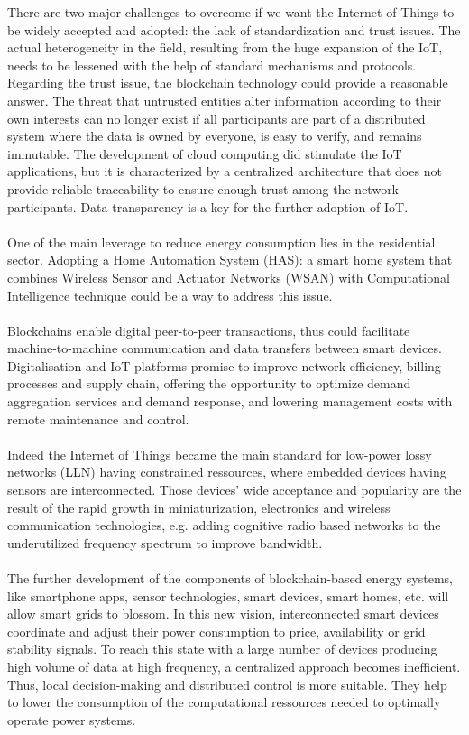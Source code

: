 \documentclass[11pt]{article}
\begin{document}
There are two major challenges to overcome if we want the Internet of Things to be widely accepted and adopted: the lack of standardization and trust issues. The actual heterogeneity in the field, resulting from the huge expansion of the IoT, needs to be lessened with the help of standard mechanisms and protocols. Regarding the trust issue, the blockchain technology could provide a reasonable answer. The threat that untrusted entities alter information according to their own interests can no longer exist if all participants are part of a distributed system where the data is owned by everyone, is easy to verify, and remains immutable. The development of cloud computing did stimulate the IoT applications, but it is characterized by a centralized architecture that does not provide reliable traceability to ensure enough trust among the network participants. Data transparency is a key for the further adoption of IoT.\cite{8}\\\\
One of the main leverage to reduce energy consumption lies in the residential sector. Adopting a Home Automation System (HAS): a smart home system that combines Wireless Sensor and Actuator Networks (WSAN) with Computational Intelligence technique could be a way to address this issue.\cite{9}\\\\
Blockchains enable digital peer-to-peer transactions, thus could facilitate machine-to-machine communication and data transfers between smart devices. Digitalisation and IoT platforms promise to improve network efficiency, billing processes and supply chain, offering the opportunity to optimize demand aggregation services and demand response, and lowering management costs with remote maintenance and control.\cite{10}\\\\
Indeed the Internet of Things became the main standard for low-power lossy networks (LLN) having constrained ressources, where embedded devices having sensors are interconnected. Those devices' wide acceptance and popularity are the result of the rapid growth in miniaturization, electronics and wireless communication technologies, e.g. adding cognitive radio based networks to the underutilized frequency spectrum to improve bandwidth.\cite{15}\\\\
The further development of the components of blockchain-based energy systems, like smartphone apps, sensor technologies, smart devices, smart homes, etc. will allow smart grids to blossom. In this new vision, interconnected smart devices coordinate and adjust their power consumption to price, availability or grid stability signals. To reach this state with a large number of devices producing high volume of data at high frequency, a centralized approach becomes inefficient. Thus, local decision-making and distributed control is more suitable. They help to lower the consumption of the computational ressources needed to optimally operate power systems.\cite{10}\\
\end{document}
